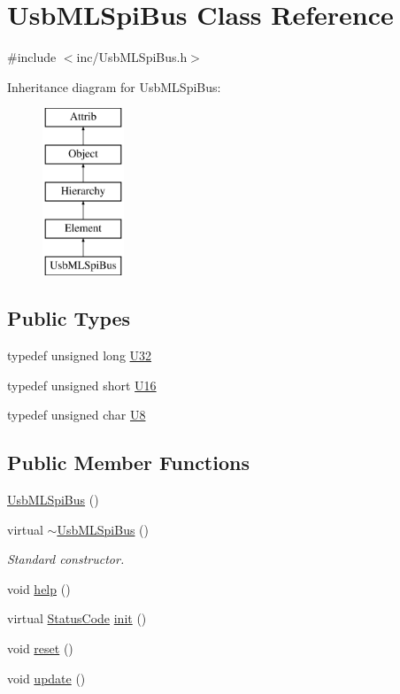\hypertarget{classUsbMLSpiBus}{}\section{Usb\+M\+L\+Spi\+Bus Class Reference}
\label{classUsbMLSpiBus}


{\ttfamily \#include $<$inc/\+Usb\+M\+L\+Spi\+Bus.\+h$>$}

Inheritance diagram for Usb\+M\+L\+Spi\+Bus\+:\begin{figure}[H]
\begin{center}
\leavevmode
\includegraphics[height=5.000000cm]{classUsbMLSpiBus}
\end{center}
\end{figure}
\subsection*{Public Types}
\begin{DoxyCompactItemize}
\item 
typedef unsigned long \hyperlink{classUsbMLSpiBus_a9b33e21d66212d15ad6e88e85bfe645a}{U32}
\item 
typedef unsigned short \hyperlink{classUsbMLSpiBus_a99eae888c884460a5652b6e26d235886}{U16}
\item 
typedef unsigned char \hyperlink{classUsbMLSpiBus_a2481f08754a9a74061e1e9e68bbcac85}{U8}
\end{DoxyCompactItemize}
\subsection*{Public Member Functions}
\begin{DoxyCompactItemize}
\item 
\hyperlink{classUsbMLSpiBus_a30c4c229be1192e5a42afdaba700d1ed}{Usb\+M\+L\+Spi\+Bus} ()
\item 
virtual \hyperlink{classUsbMLSpiBus_a7173a534262c4d0d6e3a09a23acbd983}{$\sim$\+Usb\+M\+L\+Spi\+Bus} ()
\begin{DoxyCompactList}\small\item\em Standard constructor. \end{DoxyCompactList}\item 
void \hyperlink{classUsbMLSpiBus_a9ff9537179dc4a861afcd3fea9e60da7}{help} ()
\item 
virtual \hyperlink{classStatusCode}{Status\+Code} \hyperlink{classUsbMLSpiBus_a0c5faca75cb804316429a5e249166847}{init} ()
\item 
void \hyperlink{classUsbMLSpiBus_a54d922397179722e0117626db1fdbe70}{reset} ()
\item 
void \hyperlink{classUsbMLSpiBus_ac060fc74b974a48e97e992f2a6c9773c}{update} ()
\end{DoxyCompactItemize}
